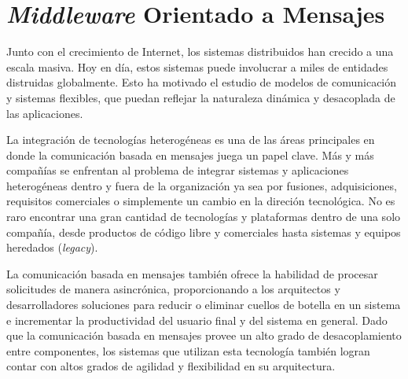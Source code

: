 \documentclass[11pt, twoside]{report}
\begin{document}
%






\chapter{\emph{Middleware} Orientado a Mensajes}

Junto con el crecimiento de Internet, los sistemas distribuidos han crecido a una escala masiva. Hoy en día, estos sistemas puede involucrar a miles de entidades distruidas globalmente. Esto ha motivado el estudio de modelos de comunicación y sistemas flexibles, que puedan reflejar la naturaleza dinámica y desacoplada de las aplicaciones.

La integración de tecnologías heterogéneas es una de las áreas principales en donde la comunicación basada en mensajes juega un papel clave. Más y más compañías se enfrentan al problema de integrar sistemas y aplicaciones heterogéneas dentro y fuera de la organización ya sea por fusiones, adquisiciones, requisitos comerciales o simplemente un cambio en la direción tecnológica. No es raro encontrar una gran cantidad de tecnologías y plataformas dentro de una solo compañía, desde productos de código libre y comerciales hasta sistemas y equipos heredados (\emph{legacy}).

La comunicación basada en mensajes también ofrece la habilidad de procesar solicitudes de manera asincrónica, proporcionando a los arquitectos y desarrolladores soluciones para reducir o eliminar cuellos de botella en un sistema e incrementar la productividad del usuario final y del sistema en general. Dado que la comunicación basada en mensajes provee un alto grado de desacoplamiento entre componentes, los sistemas que utilizan esta tecnología también logran contar con altos grados de agilidad y flexibilidad en su arquitectura.
\end{document}
